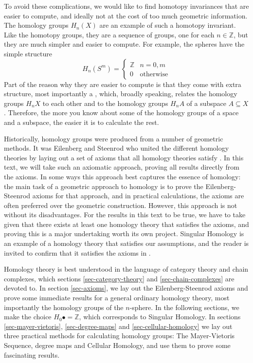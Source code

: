 To avoid these complications, we would like to find homotopy invariances that are easier to compute, and ideally not at the cost of too much geometric information. The homology groups $H_n(X)$ are an example of such a homotopy invariant. Like the homotopy groups, they are a sequence of groups, one for each $n\in \mathbb{Z}$, but they are much simpler and easier to compute. For example, the spheres have the simple structure $$H_n(S^m)=\begin{cases}\mathbb{Z} & n=0,m\\ 0 & \text{otherwise}\end{cases}$$
Part of the reason why they are easier to compute is that they come with extra structure, most importantly a , which, broadly speaking, relates the homology groups $H_nX$ to each other and to the homology groups $H_nA$ of a subspace $A\subseteq X$. Therefore, the more you know about some of the homology groups of a space and a subspace, the easier it is to calculate the rest.

Historically, homology groups were produced from a number of geometric methods. It was Eilenberg and Steenrod who united the different homology theories by laying out a set of axioms that all homology theories satisfy \cite{Eilenberg}. In this text, we will take such an axiomatic approach, proving all results directly from the axioms. In some ways this approach best captures the essence of homology: the main task of a geometric approach to homology is to prove the Eilenberg-Steenrod axioms for that approach, and in practical calculations, the axioms are often preferred over the geometric construction. However, this approach is not without its disadvantages. For the results in this text to be true, we have to take given that there exists at least one homology theory that satisfies the axioms, and proving this is a major undertaking worth its own project. Singular Homology is an example of a homology theory that satisfies our assumptions, and the reader is invited to confirm that it satisfies the axioms in \cite{Hatcher}.

Homology theory is best understood in the language of category theory and chain complexes, which sections \ref{sec-category-theory} and \ref{sec-chain-complexes} are devoted to. In section \ref{sec-axioms}, we lay out the Eilenberg-Steenrod axioms and prove some immediate results for a general ordinary homology theory, most importantly the homology groups of the $n$-sphere. In the following sections, we make the choice $H_0 \bullet=\mathbb{Z}$, which corresponds to Singular Homology. In sections \ref{sec-mayer-vietoris}, \ref{sec-degree-maps} and \ref{sec-cellular-homology} we lay out three practical methods for calculating homology groups: The Mayer-Vietoris Sequence, degree maps and Cellular Homology, and use them to prove some fascinating results.